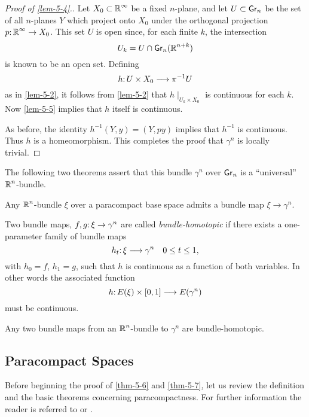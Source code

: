 \begin{proof}[Proof of \cref{lem-5-4}.]
	Let $X_{0} \subset \boldsymbol{\mathbb{R}}^{\infty}$ be a fixed $n$-plane, and let $U \subset \grass{n}{}$ be the set of all $n$-planes $Y$ which project onto $X_{0}$ under the orthogonal projection $\map{p}{\R^{\infty}}{ X_{0}}$. This set $U$ is open since, for each finite $k$, the intersection
	\[
	U_{k}=U \cap \grass{n}{n+k}
	\]
	is known to be an open set. Defining 
	\[ \map{h}{U \times X_{0}}{\pi^{-1} U}\]
	as in \cref{lem-5-2}, it follows from \cref{lem-5-2} that $h \mid _{U_{k} \times X_{0}}$ is continuous for each $k$. Now \cref{lem-5-5} implies that $h$ itself is continuous.
	
	As before, the identity $h^{-1}(Y, y)=(Y, py)$ implies that $h^{-1}$ is continuous. Thus $h$ is a homeomorphism. This completes the proof that $\gamma^{n}$ is locally trivial.
\end{proof}

The following two theorems assert that this bundle $\gamma^{n}$ over $\grass{n}{}$ is a ``universal'' $\boldsymbol{\mathbb{R}}^{n}$-bundle.
\begin{theorem}\label{thm-5-6}
	 Any $\boldsymbol{\mathbb{R}}^{n}$-bundle $\xi$ over a paracompact base space admits a bundle map $\xi \rightarrow \gamma^{n}$.
\end{theorem}
\begin{definition}\label{def:5-3}
Two bundle maps, $\map{f, g}{\xi}{\gamma^{n}}$ are called \textit{bundle-homotopic} if there exists a one-parameter family of bundle maps
\[
\map{h_{t}}{\xi}{\gamma^{n}}\quad 0 \leq t \leq 1,
\]
with $h_{0}=f$, $h_{1}=g$, such that $h$ is continuous as a function of both variables. In other words the associated function
\[\map{h}{E(\xi) \times[0,1]}{E(\gamma^{n})}
\]
must be continuous.	
\end{definition}


\begin{theorem}\label{thm-5-7}
	Any two bundle maps from an $\boldsymbol{\mathbb{R}}^{n}$-bundle to $\gamma^{n}$ are bundle-homotopic.
\end{theorem}

\subsection*{Paracompact Spaces}

Before beginning the proof of \cref{thm-5-6} and \cref{thm-5-7}, let us review the definition and the basic theorems concerning paracompactness. For further information the reader is referred to \cite{41} or \cite{73}.

